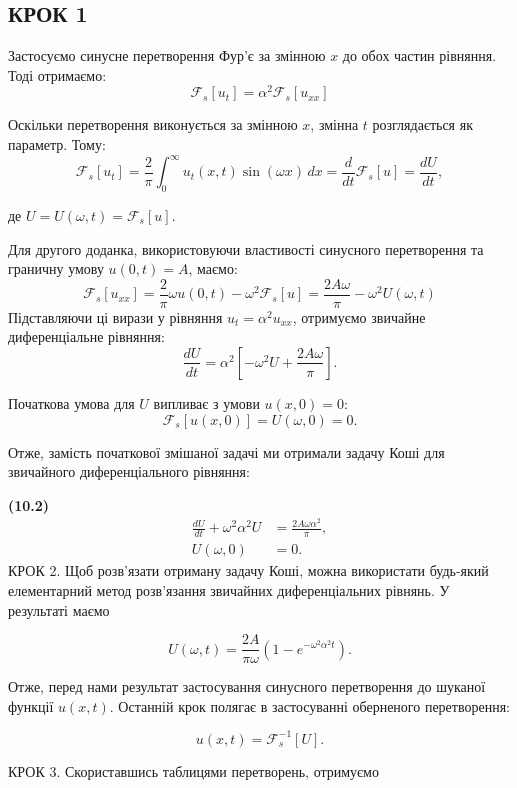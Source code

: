 \subsection{КРОК 1}\label{ux43aux440ux43eux43a-1}

Застосуємо синусне перетворення Фур'є за змінною \(x\) до обох частин рівняння. Тоді отримаємо:\\
\[  
\mathcal{F}_s[u_t] = \alpha^2 \mathcal{F}_s[u_{xx}]  
\]

Оскільки перетворення виконується за змінною \(x\), змінна \(t\) розглядається як параметр. Тому:\\
\[  
\mathcal{F}_s[u_t]  
= \frac{2}{\pi}\int_{0}^{\infty} u_t(x,t)\sin(\omega x)\,dx  
= \frac{d}{dt}\mathcal{F}_s[u]  
= \frac{dU}{dt},  
\]

де \(U = U(\omega, t) = \mathcal{F}_s[u]\).

Для другого доданка, використовуючи властивості синусного перетворення та граничну умову \(u(0,t)=A\), маємо:\\
\[  
\mathcal{F}_s[u_{xx}] = \frac{2}{\pi}\omega u(0,t) - \omega^2 \mathcal{F}_s[u]  
= \frac{2A\omega}{\pi} - \omega^2 U(\omega,t)  
\] Підставляючи ці вирази у рівняння \(u_t = \alpha^2 u_{xx}\), отримуємо звичайне диференціальне рівняння: \[
\frac{dU}{dt} = \alpha^2\left[-\omega^2 U + \frac{2A\omega}{\pi}\right].
\]

Початкова умова для \(U\) випливає з умови \(u(x,0)=0\): \[
\mathcal{F}_s[u(x,0)] = U(\omega,0) = 0.
\]

Отже, замість початкової змішаної задачі ми отримали задачу Коші для звичайного диференціального рівняння:

\textbf{(10.2)} \[
\begin{aligned}
\frac{dU}{dt} + \omega^2 \alpha^2 U &= \frac{2A\omega \alpha^2}{\pi}, \\
U(\omega,0) &= 0.
\end{aligned}
\] КРОК 2. Щоб розв'язати отриману задачу Коші, можна використати будь-який елементарний метод розв'язання звичайних диференціальних рівнянь. У результаті маємо

\[
U(\omega,t)=\frac{2A}{\pi\omega}\left(1-e^{-\omega^2\alpha^2 t}\right).
\]

Отже, перед нами результат застосування синусного перетворення до шуканої функції \(u(x,t)\). Останній крок полягає в застосуванні оберненого перетворення:

\[
u(x,t)=\mathcal{F}_s^{-1}[U].
\]

КРОК 3. Скориставшись таблицями перетворень, отримуємо


